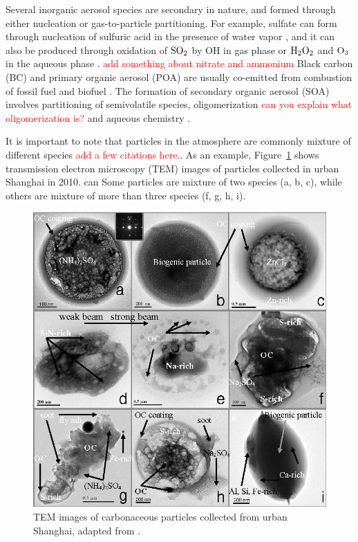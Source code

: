 \documentclass[edeposit,fullpage]{uiucthesis2009}
\begin{document}
Several inorganic aerosol species are secondary in nature, and formed
through either nucleation or gas-to-particle partitioning. For
example, sulfate can form through nucleation of sulfuric acid in the
presence of water vapor \citep{sipila2010role}, and it can also be
produced through oxidation of $\rm SO_2$ by OH in gas phase or $\rm
H_2O_2$ and $\rm O_3$ in the aqueous phase
\citep{shao2019heterogeneous,
  zheng2020multiphase}. \textcolor{red}{add something about nitrate
  and ammonium} Black carbon (BC) and primary organic aerosol (POA)
are usually co-emitted from combustion of fossil fuel and biofuel
\citep{bond2007historical}. The formation of secondary organic aerosol
(SOA) involves partitioning of semivolatile species, oligomerization
\textcolor{red}{can you explain what oligomerization is?} and aqueous
chemistry \citep{zhu2017mechanism, lim2010aqueous, griffin2013sources,
  mcneill2015aqueous}.

It is important to note that particles in the atmosphere are commonly
mixture of different species \textcolor{red}{add a few citations
  here.}. As an example, Figure~\ref{fig:chap1-mixing} shows
transmission electron microscopy (TEM) images of particles collected
in urban Shanghai in 2010.  can Some particles are mixture of two
species (a, b, c), while others are mixture of more than three species
(f, g, h, i).

\begin{figure}
	\centering
	\includegraphics[scale=0.40]{chap1_figs/thesis_chap1_fig2.png}
	\caption{TEM images of carbonaceous particles collected from
          urban Shanghai, adapted from \cite{fu2012morphology}.}
	\label{fig:chap1-mixing}
\end{figure}
\end{document}
